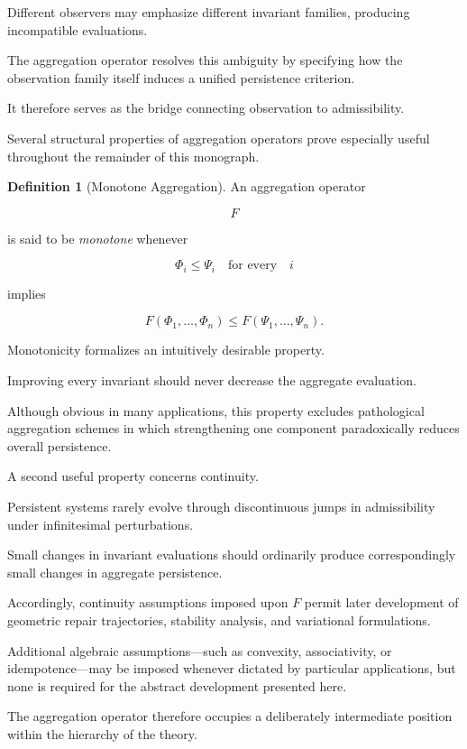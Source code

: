 \documentclass[11pt]{book}
\numberwithin{equation}{chapter}
\theoremstyle{definition}
\newtheorem{definition}{Definition}[chapter]
\theoremstyle{plain}
\begin{document}
Different observers may emphasize different invariant families, producing incompatible evaluations.

The aggregation operator resolves this ambiguity by specifying how the observation family itself induces a unified persistence criterion.

It therefore serves as the bridge connecting observation to admissibility.

Several structural properties of aggregation operators prove especially useful throughout the remainder of this monograph.

\begin{definition}[Monotone Aggregation]

An aggregation operator

\[
F
\]

is said to be \emph{monotone} whenever

\[
\Phi_i\le\Psi_i
\quad
\text{for every}
\quad
i
\]

implies

\[
F(\Phi_1,\ldots,\Phi_n)
\le
F(\Psi_1,\ldots,\Psi_n).
\]

\end{definition}

Monotonicity formalizes an intuitively desirable property.

Improving every invariant should never decrease the aggregate evaluation.

Although obvious in many applications, this property excludes pathological aggregation schemes in which strengthening one component paradoxically reduces overall persistence.

A second useful property concerns continuity.

Persistent systems rarely evolve through discontinuous jumps in admissibility under infinitesimal perturbations.

Small changes in invariant evaluations should ordinarily produce correspondingly small changes in aggregate persistence.

Accordingly, continuity assumptions imposed upon \(F\) permit later development of geometric repair trajectories, stability analysis, and variational formulations.

Additional algebraic assumptions—such as convexity, associativity, or idempotence—may be imposed whenever dictated by particular applications, but none is required for the abstract development presented here.

The aggregation operator therefore occupies a deliberately intermediate position within the hierarchy of the theory.
\end{document}
